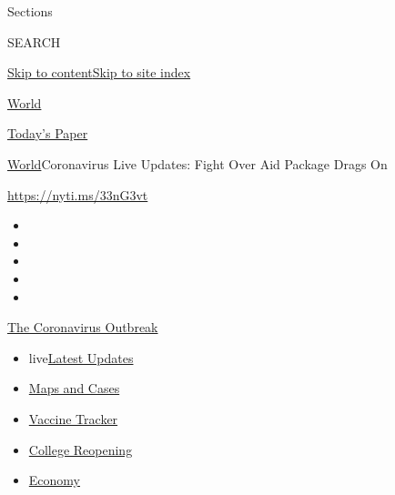 Sections

SEARCH

\protect\hyperlink{site-content}{Skip to
content}\protect\hyperlink{site-index}{Skip to site index}

\href{https://www.nytimes3xbfgragh.onion/section/world}{World}

\href{https://myaccount.nytimes3xbfgragh.onion/auth/login?response_type=cookie\&client_id=vi}{}

\href{https://www.nytimes3xbfgragh.onion/section/todayspaper}{Today's
Paper}

\href{/section/world}{World}\textbar{}Coronavirus Live Updates: Fight
Over Aid Package Drags On

\url{https://nyti.ms/33nG3vt}

\begin{itemize}
\item
\item
\item
\item
\item
\end{itemize}

\href{https://www.nytimes3xbfgragh.onion/news-event/coronavirus?action=click\&pgtype=Article\&state=default\&region=TOP_BANNER\&context=storylines_menu}{The
Coronavirus Outbreak}

\begin{itemize}
\tightlist
\item
  live\href{https://www.nytimes3xbfgragh.onion/2020/08/04/world/coronavirus-covid-19.html?action=click\&pgtype=Article\&state=default\&region=TOP_BANNER\&context=storylines_menu}{Latest
  Updates}
\item
  \href{https://www.nytimes3xbfgragh.onion/interactive/2020/us/coronavirus-us-cases.html?action=click\&pgtype=Article\&state=default\&region=TOP_BANNER\&context=storylines_menu}{Maps
  and Cases}
\item
  \href{https://www.nytimes3xbfgragh.onion/interactive/2020/science/coronavirus-vaccine-tracker.html?action=click\&pgtype=Article\&state=default\&region=TOP_BANNER\&context=storylines_menu}{Vaccine
  Tracker}
\item
  \href{https://www.nytimes3xbfgragh.onion/2020/08/02/us/covid-college-reopening.html?action=click\&pgtype=Article\&state=default\&region=TOP_BANNER\&context=storylines_menu}{College
  Reopening}
\item
  \href{https://www.nytimes3xbfgragh.onion/live/2020/08/03/business/stock-market-today-coronavirus?action=click\&pgtype=Article\&state=default\&region=TOP_BANNER\&context=storylines_menu}{Economy}
\end{itemize}

